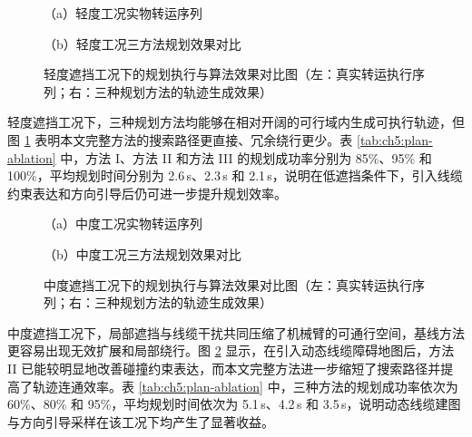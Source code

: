 \begin{figure}[htbp]
  \centering
  \begin{minipage}[t]{0.48\textwidth}
    \centering
    
    {\small （a）轻度工况实物转运序列}
  \end{minipage}
  \hfill
  \begin{minipage}[t]{0.48\textwidth}
    \centering
    
    {\small （b）轻度工况三方法规划效果对比}
  \end{minipage}
  \caption{轻度遮挡工况下的规划执行与算法效果对比图（左：真实转运执行序列；右：三种规划方法的轨迹生成效果）}
  \label{fig:ch5:plan-light}
\end{figure}

\noindent
轻度遮挡工况下，三种规划方法均能够在相对开阔的可行域内生成可执行轨迹，但图 \ref{fig:ch5:plan-light} 表明本文完整方法的搜索路径更直接、冗余绕行更少。表 \ref{tab:ch5:plan-ablation} 中，方法 I、方法 II 和方法 III 的规划成功率分别为 85\%、95\% 和 100\%，平均规划时间分别为 2.6\,s、2.3\,s 和 2.1\,s，说明在低遮挡条件下，引入线缆约束表达和方向引导后仍可进一步提升规划效率。

\begin{figure}[htbp]
  \centering
  \begin{minipage}[t]{0.48\textwidth}
    \centering
    
    {\small （a）中度工况实物转运序列}
  \end{minipage}
  \hfill
  \begin{minipage}[t]{0.48\textwidth}
    \centering
    
    {\small （b）中度工况三方法规划效果对比}
  \end{minipage}
  \caption{中度遮挡工况下的规划执行与算法效果对比图（左：真实转运执行序列；右：三种规划方法的轨迹生成效果）}
  \label{fig:ch5:plan-medium}
\end{figure}

\noindent
中度遮挡工况下，局部遮挡与线缆干扰共同压缩了机械臂的可通行空间，基线方法更容易出现无效扩展和局部绕行。图 \ref{fig:ch5:plan-medium} 显示，在引入动态线缆障碍地图后，方法 II 已能较明显地改善碰撞约束表达，而本文完整方法进一步缩短了搜索路径并提高了轨迹连通效率。表 \ref{tab:ch5:plan-ablation} 中，三种方法的规划成功率依次为 60\%、80\% 和 95\%，平均规划时间依次为 5.1\,s、4.2\,s 和 3.5\,s，说明动态线缆建图与方向引导采样在该工况下均产生了显著收益。

